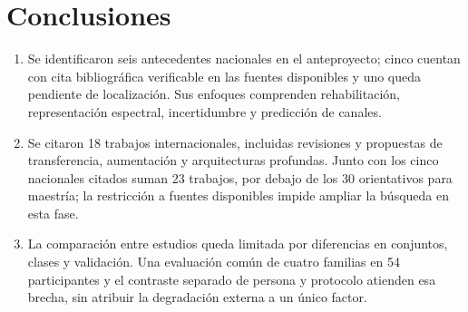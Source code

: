 \section{Conclusiones}
\begin{enumerate}
\item Se identificaron seis antecedentes nacionales en el anteproyecto; cinco cuentan con cita bibliográfica verificable en las fuentes disponibles y uno queda pendiente de localización. Sus enfoques comprenden rehabilitación, representación espectral, incertidumbre y predicción de canales.
\item Se citaron 18 trabajos internacionales, incluidas revisiones y propuestas de transferencia, aumentación y arquitecturas profundas. Junto con los cinco nacionales citados suman 23 trabajos, por debajo de los 30 orientativos para maestría; la restricción a fuentes disponibles impide ampliar la búsqueda en esta fase.
\item La comparación entre estudios queda limitada por diferencias en conjuntos, clases y validación. Una evaluación común de cuatro familias en 54 participantes y el contraste separado de persona y protocolo atienden esa brecha, sin atribuir la degradación externa a un único factor.
\end{enumerate}
